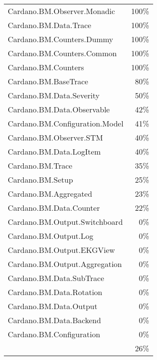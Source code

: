 \begin{tabular}{l r}
   Cardano.BM.Observer.Monadic & 100\% \\
   Cardano.BM.Data.Trace & 100\% \\
   Cardano.BM.Counters.Dummy & 100\% \\
   Cardano.BM.Counters.Common & 100\% \\
   Cardano.BM.Counters & 100\% \\
   Cardano.BM.BaseTrace & 80\% \\
   Cardano.BM.Data.Severity & 50\% \\
   Cardano.BM.Data.Observable & 42\% \\
   Cardano.BM.Configuration.Model & 41\% \\
   Cardano.BM.Observer.STM & 40\% \\
   Cardano.BM.Data.LogItem & 40\% \\
   Cardano.BM.Trace & 35\% \\
   Cardano.BM.Setup & 25\% \\
   Cardano.BM.Aggregated & 23\% \\
   Cardano.BM.Data.Counter & 22\% \\
   Cardano.BM.Output.Switchboard & 0\% \\
   Cardano.BM.Output.Log & 0\% \\
   Cardano.BM.Output.EKGView & 0\% \\
   Cardano.BM.Output.Aggregation & 0\% \\
   Cardano.BM.Data.SubTrace & 0\% \\
   Cardano.BM.Data.Rotation & 0\% \\
   Cardano.BM.Data.Output & 0\% \\
   Cardano.BM.Data.Backend & 0\% \\
   Cardano.BM.Configuration & 0\% \\
    & 26\% \\
\end{tabular}

